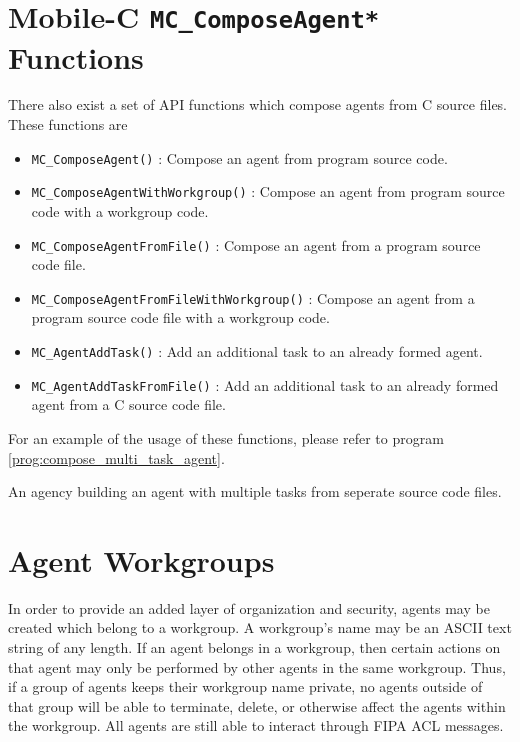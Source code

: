 \documentclass[11pt]{report}
\begin{document}
\section{Mobile-C \texttt{MC\_ComposeAgent*} Functions}
There also exist a set of API functions which compose agents from C source
files. These functions are
\begin{itemize}
\item \texttt{MC\_ComposeAgent()} : Compose an agent from program source code. 
\item \texttt{MC\_ComposeAgentWithWorkgroup()} : Compose an agent from program source code with a workgroup code. 
\item \texttt{MC\_ComposeAgentFromFile()} : Compose an agent from a program source code file. 
\item \texttt{MC\_ComposeAgentFromFileWithWorkgroup()} : Compose an agent from a program source code file with a workgroup code. 
\item \texttt{MC\_AgentAddTask()} : Add an additional task to an already formed agent.
\item \texttt{MC\_AgentAddTaskFromFile()} : Add an additional task to an already formed agent from a C source code file.
\end{itemize}
For an example of the usage of these functions, please refer to program
\ref{prog:compose_multi_task_agent}.

\begin{Program}[p]
\begin{center}
   {\footnotesize \linespread{1.0}
     }
\end{center}
\caption{An agency building an agent with multiple tasks from seperate source code files.}
\label{prog:compose_multi_task_agent}
\end{Program}

\section{Agent Workgroups}
In order to provide an added layer of organization and security, agents
may be created which belong to a workgroup. A workgroup's name may be an
ASCII text string of any length. If an agent belongs in a workgroup,
then certain actions on that agent may only be performed by other agents
in the same workgroup. Thus, if a group of agents keeps their workgroup
name private, no agents outside of that group will be able to terminate,
delete, or otherwise affect the agents within the workgroup. All agents are
still able to interact through FIPA ACL messages.
\end{document}
